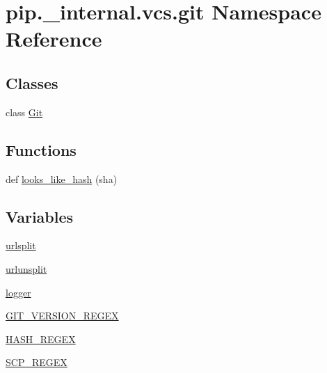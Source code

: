 \hypertarget{namespacepip_1_1__internal_1_1vcs_1_1git}{}\section{pip.\+\_\+internal.\+vcs.\+git Namespace Reference}
\label{namespacepip_1_1__internal_1_1vcs_1_1git}
\subsection*{Classes}
\begin{DoxyCompactItemize}
\item 
class \hyperlink{classpip_1_1__internal_1_1vcs_1_1git_1_1Git}{Git}
\end{DoxyCompactItemize}
\subsection*{Functions}
\begin{DoxyCompactItemize}
\item 
def \hyperlink{namespacepip_1_1__internal_1_1vcs_1_1git_a52638865863aa71b7b1c65c46f9fa398}{looks\+\_\+like\+\_\+hash} (sha)
\end{DoxyCompactItemize}
\subsection*{Variables}
\begin{DoxyCompactItemize}
\item 
\hyperlink{namespacepip_1_1__internal_1_1vcs_1_1git_a56d76d75d45883c15dac10146ce28670}{urlsplit}
\item 
\hyperlink{namespacepip_1_1__internal_1_1vcs_1_1git_ab4786d779a145bbccc568182b4bc4df2}{urlunsplit}
\item 
\hyperlink{namespacepip_1_1__internal_1_1vcs_1_1git_af227489ba32677d6b7094fa7a54dc061}{logger}
\item 
\hyperlink{namespacepip_1_1__internal_1_1vcs_1_1git_a7cd386bf40e48c772b65970facb2598a}{G\+I\+T\+\_\+\+V\+E\+R\+S\+I\+O\+N\+\_\+\+R\+E\+G\+EX}
\item 
\hyperlink{namespacepip_1_1__internal_1_1vcs_1_1git_a4f35eb79e252be7497a0f1dbf8b582aa}{H\+A\+S\+H\+\_\+\+R\+E\+G\+EX}
\item 
\hyperlink{namespacepip_1_1__internal_1_1vcs_1_1git_a050dc755b5d38a663fabb69baa7c9629}{S\+C\+P\+\_\+\+R\+E\+G\+EX}
\end{DoxyCompactItemize}


